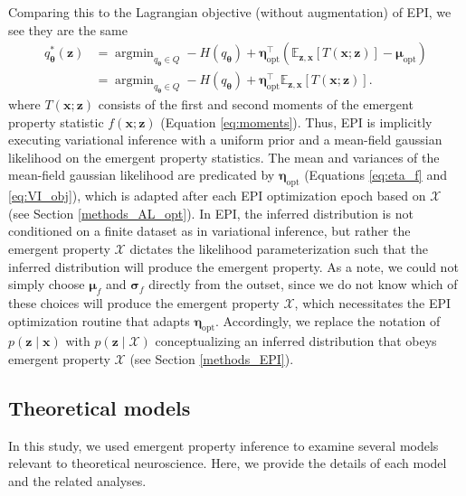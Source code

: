\documentclass[11pt]{article}
\DeclareMathOperator*{\argmin}{argmin}
\begin{document}
Comparing this to the Lagrangian objective (without augmentation) of EPI, we see they are the same
\begin{equation}
\begin{split}
q_{\bm{\theta}}^*(\mathbf{z}) &= \argmin_{q_{\bm{\theta}} \in Q} - H(q_{\bm{\theta}}) + \bm{\eta}_{\text{opt}}^\top \left(\mathbb{E}_{\mathbf{z}, \mathbf{x}} \left[T(\mathbf{x}; \mathbf{z}) \right] - \bm{\mu}_{\text{opt}} \right) \\
 &= \argmin_{q_{\bm{\theta}} \in Q} - H(q_{\bm{\theta}}) + \bm{\eta}_{\text{opt}}^\top \mathbb{E}_{\mathbf{z}, \mathbf{x}} \left[T(\mathbf{x}; \mathbf{z}) \right].
\end{split}
\end{equation}
where $T(\mathbf{x}; \mathbf{z})$ consists of the first and second moments of the emergent property statistic $f(\mathbf{x}; \mathbf{z})$ (Equation \ref{eq:moments}).
Thus, EPI is implicitly executing variational inference with a uniform prior and a mean-field gaussian likelihood on the emergent property statistics.
The mean and variances of the mean-field gaussian likelihood are predicated by $\bm{\eta}_{\text{opt}}$ (Equations \ref{eq:eta_f} and \ref{eq:VI_obj}), which is adapted after each EPI optimization epoch based on $\mathcal{X}$ (see Section \ref{methods_AL_opt}).
In EPI, the inferred distribution is not conditioned on a finite dataset as in variational inference, but rather the emergent property $\mathcal{X}$ dictates the likelihood parameterization such that the inferred distribution will produce the emergent property.
As a note, we could not simply choose $\bm{\mu}_f$ and $\bm{\sigma}_f$ directly from the outset, since we do not know which of these choices will produce the emergent property $\mathcal{X}$, which necessitates the EPI optimization routine that adapts $\bm{\eta}_{\text{opt}}$.
Accordingly, we replace the notation of $p(\mathbf{z} \mid \mathbf{x})$ with $p(\mathbf{z} \mid \mathcal{X})$ conceptualizing an inferred distribution that obeys emergent property $\mathcal{X}$ (see Section \ref{methods_EPI}). 

\subsection{Theoretical models}\label{methods_theoretical_models}
In this study, we used emergent property inference to examine several models relevant to theoretical neuroscience.  
Here, we provide the details of each model  and the related analyses.
\end{document}
